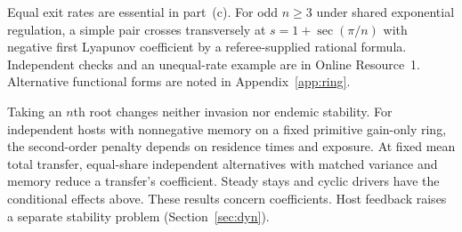 \begin{remark}\label{rem:ring-reg-odd}
Equal exit rates are essential in part~(c). For odd $n \ge 3$ under shared exponential regulation, a simple pair crosses transversely at $s = 1 + \sec(\pi/n)$ with negative first Lyapunov coefficient by a referee-supplied rational formula. Independent checks and an unequal-rate example are in Online Resource~1. Alternative functional forms are noted in Appendix~\ref{app:ring}.
\end{remark}

Taking an $n$th root changes neither invasion nor endemic stability. For independent hosts with nonnegative memory on a fixed primitive gain-only ring, the second-order penalty depends on residence times and exposure. At fixed mean total transfer, equal-share independent alternatives with matched variance and memory reduce a transfer's coefficient. Steady stays and cyclic drivers have the conditional effects above. These results concern coefficients. Host feedback raises a separate stability problem (Section~\ref{sec:dyn}).
